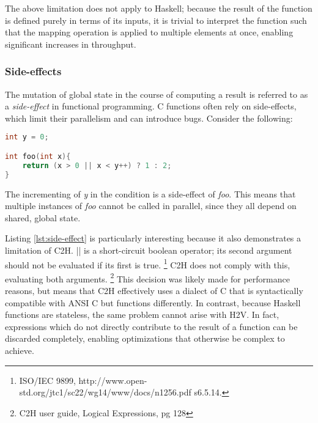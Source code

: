 \documentclass[english,onecolumn]{article}
\begin{document}
The above limitation does not apply to Haskell; because the result of the function is defined purely in terms of its inputs, it is trivial to interpret the function such that the mapping operation is applied to multiple elements at once, enabling significant increases in throughput.

\subsubsection{Side-effects}
The mutation of global state in the course of computing a result is referred to as a \textit{side-effect} in functional programming. C functions often rely on side-effects, which limit their parallelism and can introduce bugs. Consider the following:
\begin{lstlisting}[language=C, label={lst:side-effect}]
int y = 0;

int foo(int x){
    return (x > 0 || x < y++) ? 1 : 2;
}
\end{lstlisting}

The incrementing of \textit{y} in the condition is a side-effect of \textit{foo}. This means that multiple instances of \textit{foo} cannot be called in parallel, since they all depend on shared, global state.

Listing \ref{lst:side-effect} is particularly interesting because it also demonstrates a limitation of C2H. || is a short-circuit boolean operator; its second argument should not be evaluated if its first is true.%
\footnote{ISO/IEC 9899, http://www.open-std.org/jtc1/sc22/wg14/www/docs/n1256.pdf s6.5.14.}
C2H does not comply with this, evaluating both arguments.%
\footnote{C2H user guide, Logical Expressions, pg 128}
This decision was likely made for performance reasons, but means that C2H effectively uses a dialect of C that is syntactically compatible with ANSI C but functions differently.
In contrast, because Haskell functions are stateless, the same problem cannot arise with H2V. In fact, expressions which do not directly contribute to the result of a function can be discarded completely, enabling optimizations that otherwise be complex to achieve.
\end{document}
